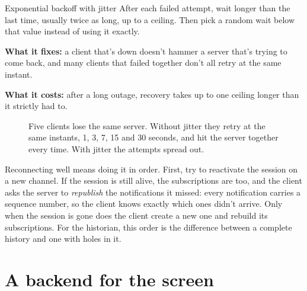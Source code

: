 \begin{concept}{Exponential backoff with jitter}
After each failed attempt, wait longer than the last time, usually twice as
long, up to a ceiling. Then pick a random wait below that value instead of
using it exactly.

\textbf{What it fixes:} a client that's down doesn't hammer a server that's
trying to come back, and many clients that failed together don't all retry at
the same instant.

\textbf{What it costs:} after a long outage, recovery takes up to one ceiling
longer than it strictly had to.
\end{concept}

\begin{figure}[htbp]
\centering
{}
\caption{Five clients lose the same server. Without jitter they retry at the
same instants, 1, 3, 7, 15 and 30 seconds, and hit the server together every
time. With jitter the attempts spread out.}
\end{figure}

Reconnecting well means doing it in order. First, try to reactivate the session
on a new channel. If the session is still alive, the subscriptions are too, and
the client asks the server to \emph{republish} the notifications it missed:
every notification carries a sequence number, so the client knows exactly which
ones didn't arrive. Only when the session is gone does the client create a new
one and rebuild its subscriptions. For the historian, this order is the
difference between a complete history and one with holes in it.

\section{A backend for the screen}

